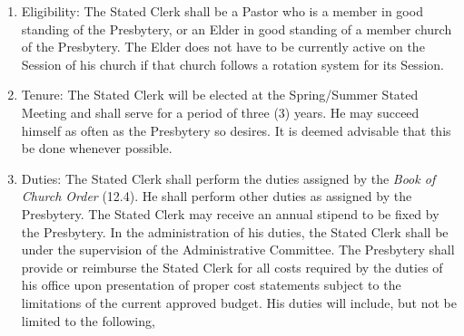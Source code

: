 \documentclass[
]{book}
\providecommand{\tightlist}{%
  \setlength{\itemsep}{0pt}\setlength{\parskip}{0pt}}
\begin{document}
\begin{enumerate}
  \begin{enumerate}
  \def\labelenumii{\arabic{enumii}.}
  \tightlist
  \item
    Eligibility: The Stated Clerk shall be a Pastor who is a member in good standing of the Presbytery, or an Elder in good standing of a member church of the Presbytery. The Elder does not have to be currently active on the Session of his church if that church follows a rotation system for its Session.
  \item
    Tenure: The Stated Clerk will be elected at the Spring/Summer Stated Meeting and shall serve for a period of three (3) years. He may succeed himself as often as the Presbytery so desires. It is deemed advisable that this be done whenever possible.
  \item
    Duties: The Stated Clerk shall perform the duties assigned by the \emph{Book of Church Order} (12.4). He shall perform other duties as assigned by the Presbytery. The Stated Clerk may receive an annual stipend to be fixed by the Presbytery. In the administration of his duties, the Stated Clerk shall be under the supervision of the Administrative Committee. The Presbytery shall provide or reimburse the Stated Clerk for all costs required by the duties of his office upon presentation of proper cost statements subject to the limitations of the current approved budget. His duties will include, but not be limited to the following,


\end{enumerate}
\end{enumerate}
\end{document}
